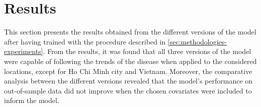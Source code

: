\chapter{Results}
\label{chap:results}

This section presents the results obtained from the different versions of the model after having trained with the procedure described in \autoref{sec:methodologies-experiments}.
From the results, it was found that all three versions of the model were capable of following the trends of the disease when applied to the considered locations, except for Ho Chi Minh city and Vietnam.
Moreover, the comparative analysis between the different versions revealed that the model's performance on out-of-sample data did not improve when the chosen covariates were included to inform the model.






